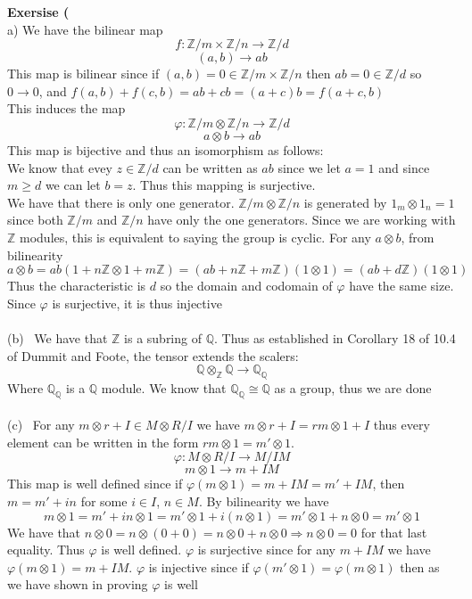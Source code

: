 \documentclass[12pt]{article}
\newenvironment{ques}[1]{\textbf{Exersise #1}\vspace{1 mm}\\ }{\bigskip}
\theoremstyle{definition}
\newcommand{\Q}{\mathbb Q}
\newcommand{\Z}{\mathbb Z}
\newcommand{\tensor}{\otimes}
\begin{document}
\begin{ques}{9.4}
	(a) We have the bilinear map 
	$$f:\Z/m \times \Z/n \to \Z/d$$
	$$(a,b) \to ab$$
	This map is bilinear since if $(a,b) = 0 \in \Z/m \times
	\Z/n$ then $ab = 0 \in \Z/d$  so $0 \to 0$, and $f(a,b) + f(c,b) = ab + cb
	= (a + c)b = f(a + c,b) $\\
	This induces the map
	$$\varphi : \Z/m \otimes \Z/n \to \Z/d$$
	$$a \otimes b \to ab$$
	This map is bijective and thus an isomorphism as follows:\\
	We know that evey $z \in \Z/d$ can
	be written as $ab$ since we let $a = 1$ and since $m \geq d$ we can let $b
	= z$. Thus this mapping is surjective.\\
	We have that there is only one generator. $\Z/m \tensor \Z/n$ is generated
	by $1_m \tensor 1_n = 1$ since both $\Z/m$ and $\Z/n$ have only the one
	generators. Since we are working with $\Z$ modules, this is equivalent to
	saying the group is cyclic. For any $a \tensor b$, from bilinearity
	$$a \tensor b = ab(1 + n\Z \tensor 1 + m\Z) = (ab
	+ n\Z + m\Z)(1 \tensor 1)= (ab + d\Z)(1 \tensor 1)$$
	Thus the characteristic is $d$ so the domain and codomain of $\varphi$
	have the same size. Since $\varphi$ is surjective, it is thus
	injective\\
	\\
	(b) \ We have that $\Z$ is a subring of $\Q$. Thus as established in
	Corollary 18 of 10.4 of Dummit and Foote, the tensor extends the scalers:
	$$\Q \tensor_\Z \Q \to \Q_\Q$$
	Where $\Q_\Q$ is a $\Q$ module. We know that $\Q_\Q \cong \Q$ as a group,
	thus we are done\\
	\\
	(c) \ For any $m \tensor r + I\in M \tensor R/I$ we have $m \tensor r + I = rm
	\tensor 1 + I$ thus every element can be written  in the form $rm \tensor 1 =
	m' \tensor 1$.
	$$\varphi: M \tensor R/I \to M/IM$$
	$$m \tensor 1\to m + IM$$
	This map is well defined since if $\varphi(m \tensor 1) = m + IM = m' +
	IM$, then $m = m' + in$ for some $i \in I$, $n \in M$. By bilinearity we
	have 
	$$m \tensor 1 = m' + in \tensor 1 = m' \tensor 1 + i(n \tensor 1) = m'
	\tensor 1 + n \tensor 0 = m' \tensor 1$$
	We have that $n \tensor 0 = n \tensor ( 0 + 0) = n \tensor 0 + n \tensor 0
	\Rightarrow n \tensor 0 = 0$ for that last equality. Thus $\varphi$ is well
	defined. $\varphi$ is surjective since for any $m + IM$ we have $\varphi
	(m \tensor 1) =m + IM$. $\varphi$ is injective since if $\varphi(m' \tensor 1) =
	\varphi(m \tensor 1)$ then as we have shown in proving $\varphi$ is well

\end{ques}
\end{document}
